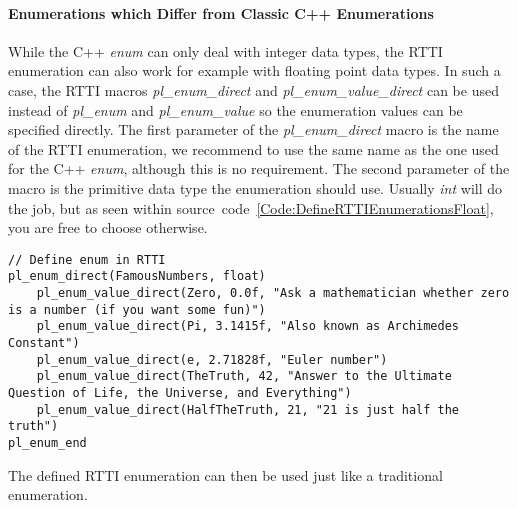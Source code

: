 \paragraph{Enumerations which Differ from Classic C++ Enumerations}
While the C++ \emph{enum} can only deal with integer data types, the RTTI enumeration can also work for example with floating point data types. In such a case, the RTTI macros \emph{pl\_enum\_direct} and \emph{pl\_enum\_value\_direct} can be used instead of \emph{pl\_enum} and \emph{pl\_enum\_value} so the enumeration values can be specified directly. The first parameter of the \emph{pl\_enum\_direct} macro is the name of the RTTI enumeration, we recommend to use the same name as the one used for the C++ \emph{enum}, although this is no requirement. The second parameter of the macro is the primitive data type the enumeration should use. Usually \emph{int} will do the job, but as seen within source~code~\ref{Code:DefineRTTIEnumerationsFloat}, you are free to choose otherwise.
\begin{lstlisting}[label=Code:DefineRTTIEnumerationsFloat,caption={Defining RTTI enumerations which differ from classic C++ enumerations}]
// Define enum in RTTI
pl_enum_direct(FamousNumbers, float)
	pl_enum_value_direct(Zero, 0.0f, "Ask a mathematician whether zero is a number (if you want some fun)")
	pl_enum_value_direct(Pi, 3.1415f, "Also known as Archimedes Constant")
	pl_enum_value_direct(e, 2.71828f, "Euler number")
	pl_enum_value_direct(TheTruth, 42, "Answer to the Ultimate Question of Life, the Universe, and Everything")
	pl_enum_value_direct(HalfTheTruth, 21, "21 is just half the truth")
pl_enum_end
\end{lstlisting}
The defined RTTI enumeration can then be used just like a traditional enumeration.



